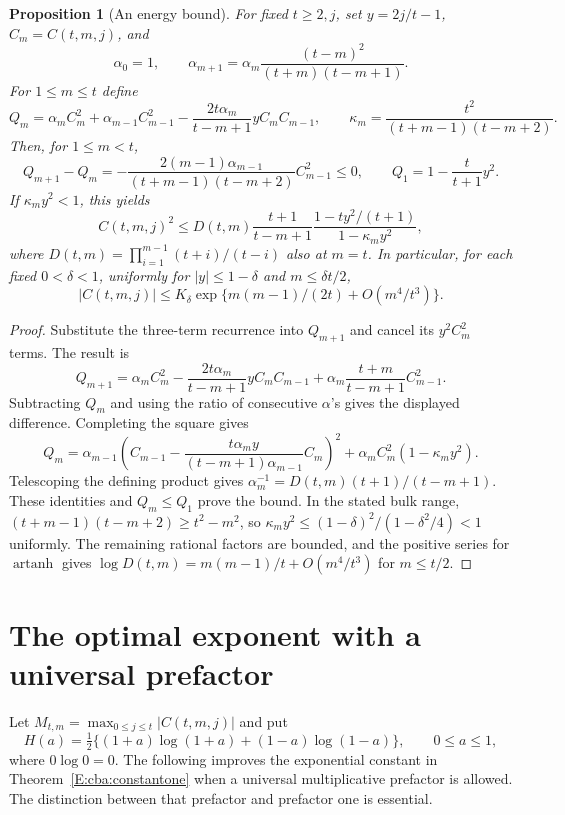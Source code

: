 \documentclass[11pt,a4paper]{article}
\newtheorem{proposition}[theorem]{Proposition}
\theoremstyle{definition}
\theoremstyle{remark}
\numberwithin{equation}{section}
\begin{document}
\begin{proposition}[An energy bound]
\label{E:cba:energy}
For fixed $t\ge2,j$, set $y=2j/t-1$, $C_m=C(t,m,j)$, and
\[
 \alpha_0=1,\qquad
 \alpha_{m+1}=\alpha_m\frac{(t-m)^2}{(t+m)(t-m+1)}.
\]
For $1\le m\le t$ define
\[
 Q_m=\alpha_m C_m^2+\alpha_{m-1}C_{m-1}^2
       -\frac{2t\alpha_m}{t-m+1}yC_mC_{m-1},\qquad
 \kappa_m=\frac{t^2}{(t+m-1)(t-m+2)}.
\]
Then, for $1\le m<t$,
\[
 Q_{m+1}-Q_m=
 -\frac{2(m-1)\alpha_{m-1}}{(t+m-1)(t-m+2)}C_{m-1}^2\le0,
 \qquad Q_1=1-\frac{t}{t+1}y^2.
\]
If $\kappa_my^2<1$, this yields
\[
 C(t,m,j)^2\le D(t,m)\frac{t+1}{t-m+1}
                \frac{1-ty^2/(t+1)}{1-\kappa_my^2},
\]
where $D(t,m)=\prod_{i=1}^{m-1}(t+i)/(t-i)$ also at $m=t$.
In particular, for each fixed $0<\delta<1$, uniformly for
$|y|\le1-\delta$ and $m\le\delta t/2$,
\[
 |C(t,m,j)|\le K_\delta
       \exp\{m(m-1)/(2t)+O(m^4/t^3)\}.
\]
\end{proposition}
\begin{proof}
Substitute the three-term recurrence into $Q_{m+1}$ and cancel its
$y^2C_m^2$ terms. The result is
\[
 Q_{m+1}=\alpha_m C_m^2
       -\frac{2t\alpha_m}{t-m+1}yC_mC_{m-1}
       +\alpha_m\frac{t+m}{t-m+1}C_{m-1}^2.
\]
Subtracting $Q_m$ and using the ratio of consecutive $\alpha$'s
gives the displayed difference. Completing the square gives
\[
 Q_m=\alpha_{m-1}
 \left(C_{m-1}-\frac{t\alpha_m y}{(t-m+1)\alpha_{m-1}}C_m\right)^2
       +\alpha_m C_m^2(1-\kappa_my^2).
\]
Telescoping the defining product gives
$\alpha_m^{-1}=D(t,m)(t+1)/(t-m+1)$.
These identities and $Q_m\le Q_1$ prove the bound.
In the stated bulk range,
$(t+m-1)(t-m+2)\ge t^2-m^2$, so
$\kappa_my^2\le(1-\delta)^2/(1-\delta^2/4)<1$ uniformly.
The remaining rational factors are bounded, and the positive
series for $\operatorname{artanh}$ gives
$\log D(t,m)=m(m-1)/t+O(m^4/t^3)$ for $m\le t/2$.
\end{proof}



\clearpage

\section{The optimal exponent with a universal prefactor}
\label{E:cbx:sec}

Let $M_{t,m}=\max_{0\le j\le t}|C(t,m,j)|$ and put
\[
 H(a)=\tfrac12\{(1+a)\log(1+a)+(1-a)\log(1-a)\},
 \qquad 0\le a\le1,
\]
where $0\log0=0$. The following improves the exponential constant in
Theorem~\ref{E:cba:constantone} when a universal multiplicative prefactor
is allowed. The distinction between that prefactor and prefactor one
is essential.
\end{document}
